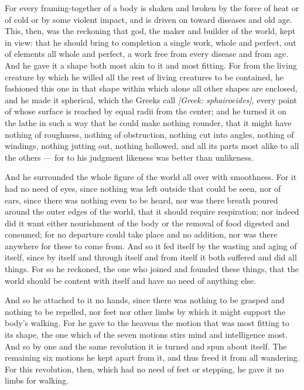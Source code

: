  For every framing-together of a body is shaken and broken by the force of heat or of cold or by some violent impact, and is driven on toward diseases and old age. This, then, was the reckoning that god, the maker and builder of the world, kept in view: that he should bring to completion a single work, whole and perfect, out of elements all whole and perfect, a work free from every disease and from age. And he gave it a shape both most akin to it and most fitting. For from the living creature by which he willed all the rest of living creatures to be contained, he fashioned this one in that shape within which alone all other shapes are enclosed, and he made it spherical, which the Greeks call \textit{[Greek: sphairoeides]}, every point of whose surface is reached by equal radii from the center; and he turned it on the lathe in such a way that he could make nothing rounder, that it might have nothing of roughness, nothing of obstruction, nothing cut into angles, nothing of windings, nothing jutting out, nothing hollowed, and all its parts most alike to all the others — for to his judgment likeness was better than unlikeness.

 And he surrounded the whole figure of the world all over with smoothness. For it had no need of eyes, since nothing was left outside that could be seen, nor of ears, since there was nothing even to be heard, nor was there breath poured around the outer edges of the world, that it should require respiration; nor indeed did it want either nourishment of the body or the removal of food digested and consumed; for no departure could take place and no addition, nor was there anywhere for these to come from. And so it fed itself by the wasting and aging of itself, since by itself and through itself and from itself it both suffered and did all things. For so he reckoned, the one who joined and founded these things, that the world should be content with itself and have no need of anything else.

 And so he attached to it no hands, since there was nothing to be grasped and nothing to be repelled, nor feet nor other limbs by which it might support the body's walking. For he gave to the heavens the motion that was most fitting to its shape, the one which of the seven motions stirs mind and intelligence most. And so by one and the same revolution it is turned and spun about itself. The remaining six motions he kept apart from it, and thus freed it from all wandering. For this revolution, then, which had no need of feet or stepping, he gave it no limbs for walking.

